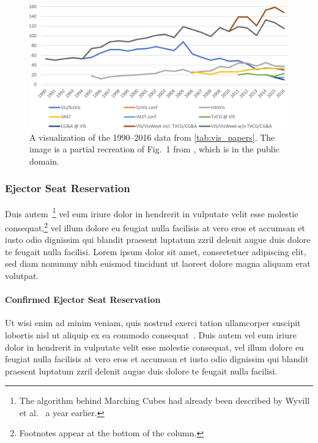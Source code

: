 \documentclass[journal]{vgtc}                %
\begin{document}
\begin{figure}[tb]
 \centering %
 \includegraphics[width=\columnwidth]{paper-count-2016}
 \caption{%
	A visualization of the 1990--2016 data from \cref{tab:vis_papers}.
	The image is a partial recreation of Fig.\ 1 from \cite{Isenberg:2017:VMC}, which is in the public domain.%
	}
 \label{fig:vis_papers}
\end{figure}


\subsubsection{Ejector Seat Reservation}

Duis autem~\cite{Lorensen:1987:MCA}\footnote{The algorithm behind Marching Cubes \cite{Lorensen:1987:MCA} had already been described by Wyvill et al.\ \cite{Wyvill:1986:DSS} a year earlier.} 
vel eum iriure dolor in hendrerit in vulputate velit esse molestie consequat,\footnote{Footnotes appear at the bottom of the column.}
vel illum dolore eu feugiat nulla facilisis at vero eros et accumsan et iusto odio dignissim qui blandit praesent luptatum zzril delenit augue duis dolore te feugait nulla facilisi.
Lorem ipsum dolor sit amet, consectetuer adipiscing elit, sed diam nonummy nibh euismod tincidunt ut laoreet dolore magna aliquam erat volutpat.


\paragraph{Confirmed Ejector Seat Reservation}

Ut wisi enim ad minim veniam, quis nostrud exerci tation ullamcorper
suscipit lobortis nisl ut aliquip ex ea commodo consequat~\cite{Nielson:1991:TAD}.
Duis autem vel eum iriure dolor in hendrerit in vulputate velit esse molestie consequat, vel illum dolore eu feugiat nulla facilisis at vero eros et accumsan et iusto odio dignissim qui blandit praesent luptatum zzril delenit augue duis dolore te feugait nulla facilisi.
\end{document}
